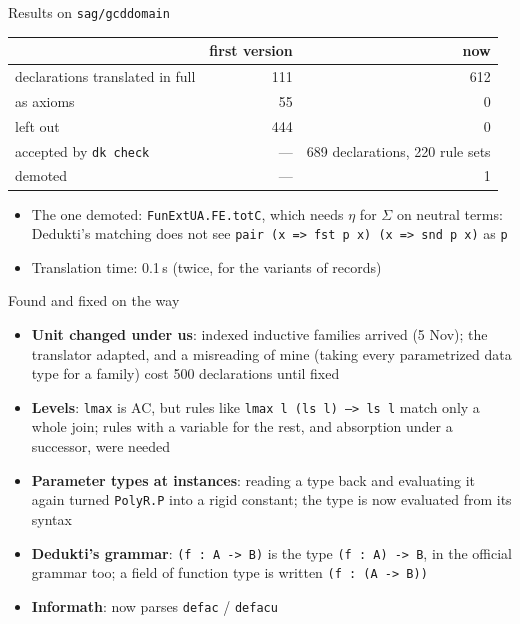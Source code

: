 \documentclass[10pt,aspectratio=169]{beamer}
\newcommand{\ok}[1]{\textcolor{good}{#1}}
\newcommand{\file}[1]{\texttt{#1}}
\begin{document}
\begin{frame}{Results on \file{sag/gcddomain}}

\centering
\begin{tabular}{lrr}
\toprule
 & first version & now \\
\midrule
declarations translated in full & 111 & \ok{612} \\
as axioms & 55 & 0 \\
left out & 444 & 0 \\
\midrule
accepted by \texttt{dk check} & --- & \ok{689 declarations, 220 rule sets} \\
demoted & --- & 1 \\
\bottomrule
\end{tabular}

\vspace{5mm}
\begin{itemize}\small
\item The one demoted: \texttt{FunExtUA.FE.totC}, which needs $\eta$ for
  $\Sigma$ on neutral terms: Dedukti's matching does not see
  \texttt{pair (x => fst p x) (x => snd p x)} as \texttt{p}
\item Translation time: 0.1\,s (twice, for the variants of records)
\end{itemize}

\end{frame}

\begin{frame}{Found and fixed on the way}

\small
\begin{itemize}
\item \textbf{Unit changed under us}: indexed inductive families arrived
  (5 Nov); the translator adapted, and a misreading of mine (taking every
  parametrized data type for a family) cost 500 declarations until fixed
\item \textbf{Levels}: \texttt{lmax} is AC, but rules like
  \texttt{lmax l (ls l) --> ls l} match only a whole join; rules with a
  variable for the rest, and absorption under a successor, were needed
\item \textbf{Parameter types at instances}: reading a type back and
  evaluating it again turned \texttt{PolyR.P} into a rigid constant;
  the type is now evaluated from its syntax
\item \textbf{Dedukti's grammar}: \texttt{(f : A -> B)} is the type
  \texttt{(f : A) -> B}, in the official grammar too; a field of function
  type is written \texttt{(f : (A -> B))}
\item \textbf{Informath}: now parses \texttt{defac} / \texttt{defacu}
\end{itemize}

\end{frame}
\end{document}
